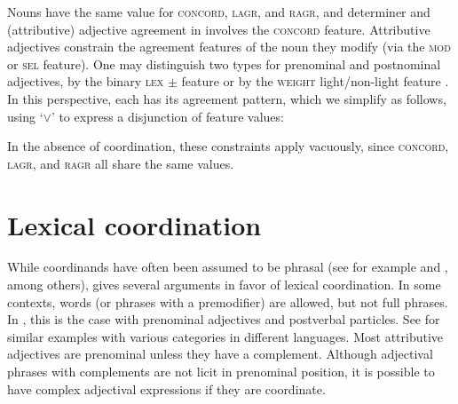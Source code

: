 \ea
{}
\z
\ea
{}  
\z

Nouns have the same value for  \textsc{concord}, \textsc{lagr}, and \textsc{ragr}, and 
determiner and (attributive) adjective agreement in   involves the  \textsc{concord} feature.
Attributive adjectives constrain the agreement features of the noun they modify (via the \textsc{mod} or \textsc{sel} feature). One may distinguish two types for prenominal and postnominal adjectives, by the binary \textsc{lex} $\pm$ feature \citep{Sadler:Arnold:94} or by the \textsc{weight} light/non-light feature \citep{Abeille:Godard:99}. In this perspective, each has its agreement pattern, which we simplify as follows, using `$\vee$' to express a disjunction of feature values:

\ea
{}
\z
\ea
{}
\z

\noindent
In the absence of coordination, these constraints apply vacuously, since \textsc{concord}, \textsc{lagr}, and \textsc{ragr} all share the same values. 


\section{Lexical coordination}\label{lexcoord}\label{coordination:sec-lexical-coordination}


While coordinands have often been assumed to be phrasal (see for example \citealt[Section~6.2]{Kayne:94} and \citealt[Section~5.2]{bruening}, among others), \citet{Abeille:06} gives several arguments in favor of lexical coordination.
In some contexts, words (or phrases with a premodifier) are allowed, but not full phrases. In , this is the case with prenominal adjectives and postverbal particles. See \citet[Section~4]{Abeille:06} for similar examples with various categories in different languages. Most  attributive adjectives are prenominal unless they have a complement. Although  adjectival phrases with complements are not licit in prenominal position,  it is possible to have complex adjectival expressions if they are coordinate.

